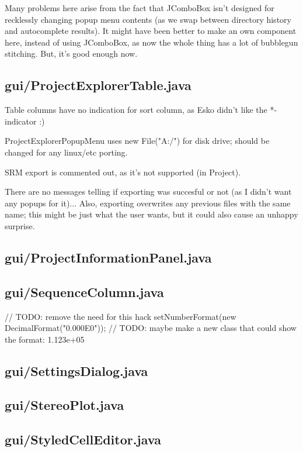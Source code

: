 Many problems here arise from the fact that JComboBox isn't designed for recklessly changing popup menu contents (as we swap between directory history and autocomplete results). It might have been better to make an own component here, instead of using JComboBox, as now the whole thing has a lot of bubblegun stitching. But, it's good enough now.


\subsection{gui/ProjectExplorerTable.java}

Table columns have no indication for sort column, as Esko didn't like the *-indicator :)
	    
ProjectExplorerPopupMenu uses new File("A:/") for disk drive; should be changed for any linux/etc porting.

SRM export is commented out, as it's not supported (in Project).

There are no messages telling if exporting was succesful or not (as I didn't want any popups for it)... Also, exporting overwrites any previous files with the same name; this might be just what the user wants, but it could also cause an unhappy surprise.


\subsection{gui/ProjectInformationPanel.java}

\subsection{gui/SequenceColumn.java}
        // TODO: remove the need for this hack
            setNumberFormat(new DecimalFormat("0.000E0"));  // TODO: maybe make a new class that could show the format: 1.123e+05

\subsection{gui/SettingsDialog.java}

\subsection{gui/StereoPlot.java}

\subsection{gui/StyledCellEditor.java}

